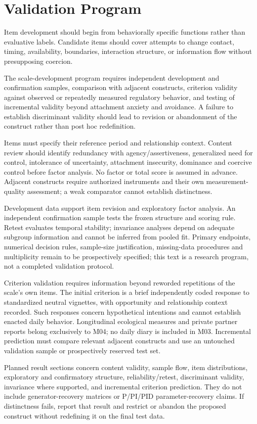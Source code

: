 \section{Validation Program}

Item development should begin from behaviorally specific functions rather than evaluative labels. Candidate items should cover attempts to change contact, timing, availability, boundaries, interaction structure, or information flow without presupposing coercion.

The scale-development program requires independent development and confirmation samples, comparison with adjacent constructs, criterion validity against observed or repeatedly measured regulatory behavior, and testing of incremental validity beyond attachment anxiety and avoidance. A failure to establish discriminant validity should lead to revision or abandonment of the construct rather than post hoc redefinition.

Items must specify their reference period and relationship context. Content review should identify redundancy with agency/assertiveness, generalized need for control, intolerance of uncertainty, attachment insecurity, dominance and coercive control before factor analysis. No factor or total score is assumed in advance. Adjacent constructs require authorized instruments and their own measurement-quality assessment; a weak comparator cannot establish distinctness.

Development data support item revision and exploratory factor analysis. An independent confirmation sample tests the frozen structure and scoring rule. Retest evaluates temporal stability; invariance analyses depend on adequate subgroup information and cannot be inferred from pooled fit. Primary endpoints, numerical decision rules, sample-size justification, missing-data procedures and multiplicity remain to be prospectively specified; this text is a research program, not a completed validation protocol.

Criterion validation requires information beyond reworded repetitions of the scale's own items. The initial criterion is a brief independently coded response to standardized neutral vignettes, with opportunity and relationship context recorded. Such responses concern hypothetical intentions and cannot establish enacted daily behavior. Longitudinal ecological measures and private partner reports belong exclusively to M04; no daily diary is included in M03. Incremental prediction must compare relevant adjacent constructs and use an untouched validation sample or prospectively reserved test set.

Planned result sections concern content validity, sample flow, item distributions, exploratory and confirmatory structure, reliability/retest, discriminant validity, invariance where supported, and incremental criterion prediction. They do not include generator-recovery matrices or P/PI/PID parameter-recovery claims. If distinctness fails, report that result and restrict or abandon the proposed construct without redefining it on the final test data.
